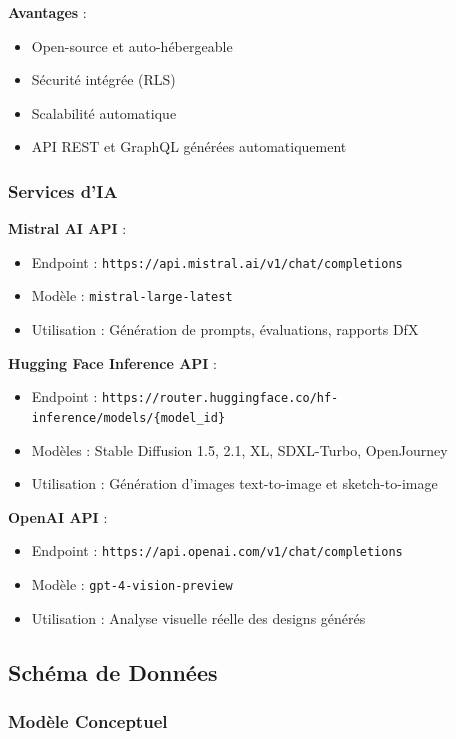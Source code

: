 \textbf{Avantages} :
\begin{itemize}[leftmargin=*]
    \item Open-source et auto-hébergeable
    \item Sécurité intégrée (RLS)
    \item Scalabilité automatique
    \item API REST et GraphQL générées automatiquement
\end{itemize}

\subsubsection{Services d'IA}

\textbf{Mistral AI API} :
\begin{itemize}[leftmargin=*]
    \item Endpoint : \texttt{https://api.mistral.ai/v1/chat/completions}
    \item Modèle : \texttt{mistral-large-latest}
    \item Utilisation : Génération de prompts, évaluations, rapports DfX
\end{itemize}

\textbf{Hugging Face Inference API} :
\begin{itemize}[leftmargin=*]
    \item Endpoint : \texttt{https://router.huggingface.co/hf-inference/models/\{model\_id\}}
    \item Modèles : Stable Diffusion 1.5, 2.1, XL, SDXL-Turbo, OpenJourney
    \item Utilisation : Génération d'images text-to-image et sketch-to-image
\end{itemize}

\textbf{OpenAI API} :
\begin{itemize}[leftmargin=*]
    \item Endpoint : \texttt{https://api.openai.com/v1/chat/completions}
    \item Modèle : \texttt{gpt-4-vision-preview}
    \item Utilisation : Analyse visuelle réelle des designs générés
\end{itemize}

\subsection{Schéma de Données}

\subsubsection{Modèle Conceptuel}

